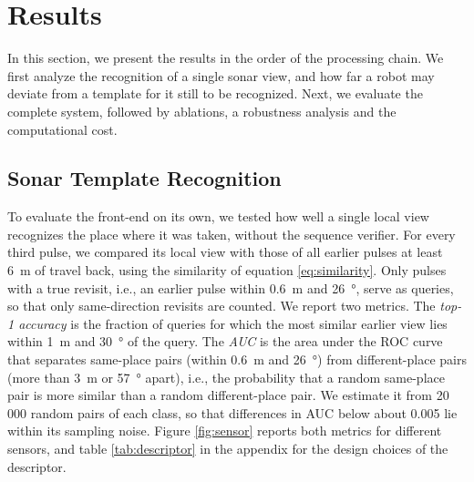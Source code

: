 \section{Results}
\label{sec:results}
In this section, we present the results in the order of the processing chain. We first analyze the recognition of a single sonar view, and how far a robot may deviate from a template for it still to be recognized. Next, we evaluate the complete system, followed by ablations, a robustness analysis and the computational cost.

\subsection{Sonar Template Recognition}
\label{sec:resultsFrontend}
To evaluate the front-end on its own, we tested how well a single local view recognizes the place where it was taken, without the sequence verifier. For every third pulse, we compared its local view with those of all earlier pulses at least \SI{6}{\meter} of travel back, using the similarity of equation \ref{eq:similarity}. Only pulses with a true revisit, i.e., an earlier pulse within \SI{0.6}{\meter} and \SI{26}{\degree}, serve as queries, so that only same-direction revisits are counted. We report two metrics. The \emph{top-1 accuracy} is the fraction of queries for which the most similar earlier view lies within \SI{1}{\meter} and \SI{30}{\degree} of the query. The \emph{AUC} is the area under the ROC curve that separates same-place pairs (within \SI{0.6}{\meter} and \SI{26}{\degree}) from different-place pairs (more than \SI{3}{\meter} or \SI{57}{\degree} apart), i.e., the probability that a random same-place pair is more similar than a random different-place pair. We estimate it from 20\,000 random pairs of each class, so that differences in AUC below about 0.005 lie within its sampling noise. Figure \ref{fig:sensor} reports both metrics for different sensors, and table \ref{tab:descriptor} in the appendix for the design choices of the descriptor.

